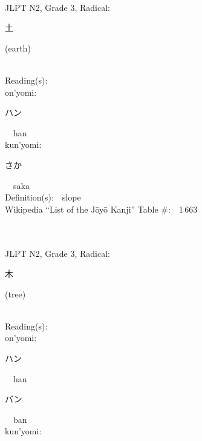 \begin{multicols}{2}
{\fontsize{34pt}{40pt}  }\ \ \\  %
{JLPT N2, Grade 3, Radical:\ \ {\begin{CJK}{UTF8}{min} 土 \end{CJK}} (earth) } \\
Reading(s):\ \ \\
{\hspace*{1em}}on'yomi:\ \ \\
{\hspace*{2em}}{\begin{CJK}{UTF8}{min} ハン \end{CJK}}\ \ han\ \ \\
{\hspace*{1em}}kun'yomi:\ \ \\
{\hspace*{2em}}{\begin{CJK}{UTF8}{min} さか \end{CJK}}\ \ saka\ \ \\
Definition(s):\ \ slope \\
Wikipedia ``List of the J\=oy\=o Kanji'' Table \#:\ \ 1\,663 \\
\ \ \\
{\fontsize{34pt}{40pt}  }\ \ \\  %
{JLPT N2, Grade 3, Radical:\ \ {\begin{CJK}{UTF8}{min} 木 \end{CJK}} (tree) } \\
Reading(s):\ \ \\
{\hspace*{1em}}on'yomi:\ \ \\
{\hspace*{2em}}{\begin{CJK}{UTF8}{min} ハン \end{CJK}}\ \ han\ \ \\
{\hspace*{2em}}{\begin{CJK}{UTF8}{min} バン \end{CJK}}\ \ ban\ \ \\
{\hspace*{1em}}kun'yomi:\ \ \\

\end{multicols}

